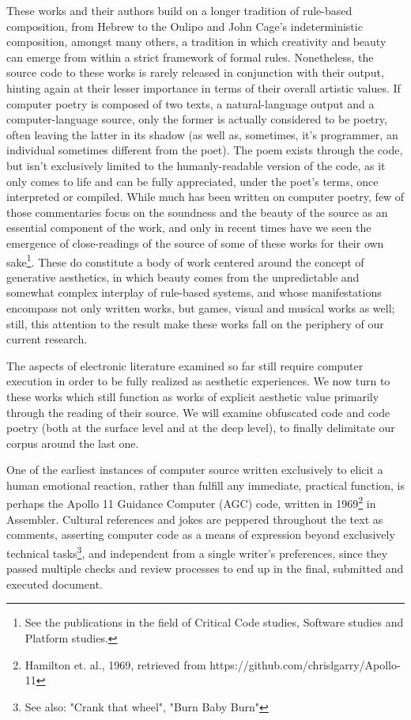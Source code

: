 \documentclass{article}
\begin{document}
These works and their authors build on a longer tradition of rule-based composition, from Hebrew to the Oulipo and John Cage's indeterministic composition, amongst many others\cite{cramer_words_2003}, a tradition in which creativity and beauty can emerge from within a strict framework of formal rules. Nonetheless, the source code to these works is rarely released in conjunction with their output, hinting again at their lesser importance in terms of their overall artistic values. If computer poetry is composed of two texts, a natural-language output and a computer-language source, only the former is actually considered to be poetry, often leaving the latter in its shadow (as well as, sometimes, it's programmer, an individual sometimes different from the poet). The poem exists through the code, but isn't exclusively limited to the humanly-readable version of the code, as it only comes to life and can be fully appreciated, under the poet's terms, once interpreted or compiled. While much has been written on computer poetry, few of those commentaries focus on the soundness and the beauty of the source as an essential component of the work, and only in recent times have we seen the emergence of close-readings of the source of some of these works for their own sake\footnote{See the publications in the field of Critical Code studies, Software studies and Platform studies.}. These do constitute a body of work centered around the concept of generative aesthetics\cite{goriunova_read_2005}, in which beauty comes from the unpredictable and somewhat complex interplay of rule-based systems, and whose manifestations encompass not only written works, but games, visual and musical works as well; still, this attention to the result make these works fall on the periphery of our current research.

The aspects of electronic literature examined so far still require computer execution in order to be fully realized as aesthetic experiences. We now turn to these works which still function as works of explicit aesthetic value primarily through the reading of their source. We will examine obfuscated code and code poetry (both at the surface level and at the deep level), to finally delimitate our corpus around the last one.

One of the earliest instances of computer source written exclusively to elicit a human emotional reaction, rather than fulfill any immediate, practical function, is perhaps the Apollo 11 Guidance Computer (AGC) code, written in 1969\footnote{Hamilton et. al., 1969, retrieved from https://github.com/chrislgarry/Apollo-11} in Assembler. Cultural references and jokes are peppered throughout the text as comments, asserting computer code as a means of expression beyond exclusively technical tasks\footnote{See also: "Crank that wheel", "Burn Baby Burn"}, and independent from a single writer's preferences, since they passed multiple checks and review processes to end up in the final, submitted and executed document.
\end{document}
